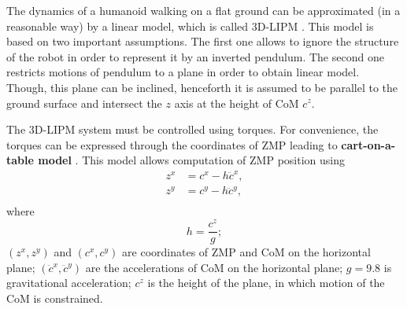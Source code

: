 The dynamics of a humanoid walking on a flat ground can be approximated (in a reasonable 
way) by a linear model, which is called \ac{3D-LIPM} \cite{3d-lipm}. This model is based 
on two important assumptions. The first one allows to ignore the structure of the robot 
in order to represent it by an inverted pendulum. The second one restricts motions of 
pendulum to a plane in order to obtain linear model. Though, this plane can be inclined, 
henceforth it is assumed to be parallel to the ground surface and intersect the $z$ axis
at the height of \ac{CoM} $c^z$.

The \ac{3D-LIPM} system must be controlled using torques. For convenience, the torques
can be expressed through the coordinates of \ac{ZMP} leading to {\bf cart-on-a-table 
model} \cite{LIPM-MPC}. This model allows computation of \ac{ZMP} position using
\begin{equation}\label{eq.zmp_cart}
\begin{split}
z^x &= c^x - h \ddot{c}^x, \\
z^y &= c^y - h \ddot{c}^y, \\
\end{split}
\end{equation}
where 
$$
h = \frac{c^z}{g};
$$
$(z^x, z^y)$ and $(c^x, c^y)$ are coordinates of \ac{ZMP} and \ac{CoM} on the 
horizontal plane; $(\ddot{c}^x, \ddot{c}^y)$ are the accelerations of \ac{CoM} 
on the horizontal plane; $g = 9.8$ is gravitational acceleration; $c^z$ is the height
of the plane, in which motion of the \ac{CoM} is constrained.

